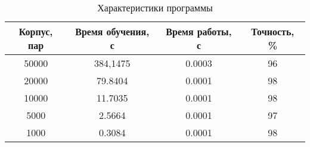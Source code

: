 \begin{table}[h!]
\caption{Характеристики программы}
\label{props}
\centering
    \begin{tabular}{|c|c|c|c|}
		\hline Корпус, пар & Время обучения, с & Время работы, с & Точность, \% \\
		\hline 50000 & 384,1475 & 0.0003 & 96 \\
		\hline 20000 & 79.8404 & 0.0001 & 98 \\
		\hline 10000 & 11.7035 & 0.0001 & 98 \\
		\hline 5000 & 2.5664 & 0.0001 & 97 \\
		\hline 1000 & 0.3084 & 0.0001 & 98 \\
		\hline
	\end{tabular}
\end{table}
\

\newpage

